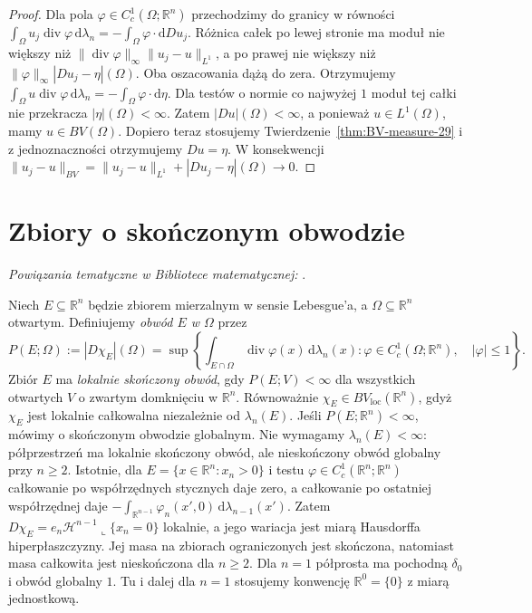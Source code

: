 \begin{proof}
Dla pola $\varphi\in C_c^1(\Omega;\mathbb R^n)$
przechodzimy do granicy w równości
$\int_\Omega u_j\operatorname{div}\varphi\,\mathrm d\lambda_n
=-\int_\Omega\varphi\cdot\mathrm dDu_j$.
Różnica całek po lewej stronie ma moduł nie większy
niż $\|\operatorname{div}\varphi\|_\infty\|u_j-u\|_{L^1}$,
a po prawej nie większy niż
$\|\varphi\|_\infty|Du_j-\eta|(\Omega)$.
Oba oszacowania dążą do zera. Otrzymujemy
$\int_\Omega u\operatorname{div}\varphi\,\mathrm d\lambda_n
=-\int_\Omega\varphi\cdot\mathrm d\eta$.
Dla testów o normie co najwyżej $1$ moduł tej całki
nie przekracza $|\eta|(\Omega)<\infty$.
Zatem $|Du|(\Omega)<\infty$, a ponieważ
$u\in L^1(\Omega)$, mamy $u\in BV(\Omega)$.
Dopiero teraz stosujemy Twierdzenie~\ref{thm:BV-measure-29}
i z jednoznaczności otrzymujemy $Du=\eta$. W konsekwencji
$\|u_j-u\|_{BV}=\|u_j-u\|_{L^1}+|Du_j-\eta|(\Omega)\to0$.
\end{proof}

\section{Zbiory o skończonym obwodzie}

\noindent\emph{Powiązania tematyczne w Bibliotece matematycznej:} .

\begin{definicja}
\label{def:finite-perimeter-29}
Niech $E\subseteq\mathbb R^n$ będzie zbiorem mierzalnym
w sensie Lebesgue'a, a $\Omega\subseteq\mathbb R^n$ otwartym.
Definiujemy \emph{obwód $E$ w $\Omega$} przez
\[
 P(E;\Omega):=|D\chi_E|(\Omega)
 =\sup\left\{\int_{E\cap\Omega}\operatorname{div}\varphi(x)
 \,\mathrm d\lambda_n(x):
 \varphi\in C_c^1(\Omega;\mathbb R^n),\quad|\varphi|\le1
 \right\}.
\]
Zbiór $E$ ma \emph{lokalnie skończony obwód},
gdy $P(E;V)<\infty$ dla wszystkich otwartych $V$
o zwartym domknięciu w $\mathbb R^n$.
Równoważnie $\chi_E\in BV_{\mathrm{loc}}(\mathbb R^n)$,
gdyż $\chi_E$ jest lokalnie całkowalna niezależnie
od $\lambda_n(E)$.
Jeśli $P(E;\mathbb R^n)<\infty$, mówimy o skończonym
obwodzie globalnym. Nie wymagamy $\lambda_n(E)<\infty$:
półprzestrzeń ma lokalnie skończony obwód, ale
nieskończony obwód globalny przy $n\ge2$.
Istotnie, dla $E=\{x\in\mathbb R^n:x_n>0\}$
i testu $\varphi\in C_c^1(\mathbb R^n;\mathbb R^n)$
całkowanie po współrzędnych stycznych daje zero,
a całkowanie po ostatniej współrzędnej daje
$-\int_{\mathbb R^{n-1}}\varphi_n(x',0)
\,\mathrm d\lambda_{n-1}(x')$.
Zatem $D\chi_E=e_n\mathcal H^{n-1}\llcorner\{x_n=0\}$
lokalnie, a jego wariacja jest miarą Hausdorffa
hiperpłaszczyzny. Jej masa na zbiorach ograniczonych
jest skończona, natomiast masa całkowita jest
nieskończona dla $n\ge2$. Dla $n=1$ półprosta
ma pochodną $\delta_0$ i obwód globalny $1$.
Tu i dalej dla $n=1$ stosujemy konwencję
$\mathbb R^0=\{0\}$ z miarą jednostkową.
\end{definicja}


